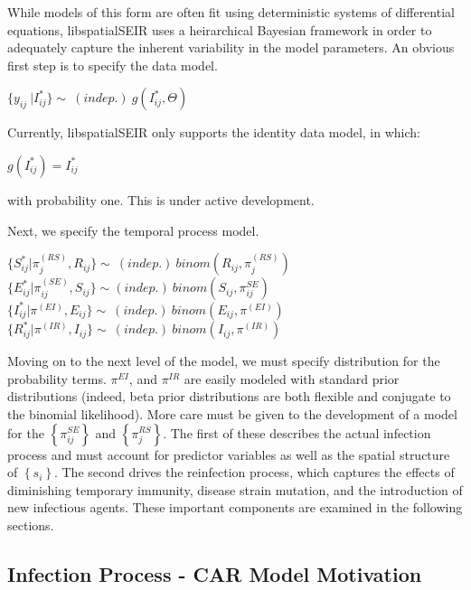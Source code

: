 \documentclass[12pt]{article}
\newcommand \noi {\noindent}
\newcommand \mbreak {\\ \vspace{0.1in}}
\begin{document}
    While models of this form are often fit using deterministic systems of differential equations, libspatialSEIR uses
    a heirarchical Bayesian framework in order to adequately capture the inherent variability in the model parameters.
    An obvious first step is to specify the data model. 

    \vspace{0.15in}

    \begin{center}
        $ \{y_{ij}\ | I^*_{ij}\} \sim\ (indep.)\ g(I^*_{ij}, \Theta)  $
    \end{center}

    Currently, libspatialSEIR only supports the identity data model, in which: 
    \begin{center}
        $g(I^*_{ij}) = I^*_{ij}$  
    \end{center}
    with probability one. This is under active development. \\

    \vspace{0.15in}

    Next, we specify the temporal process model. 
    \vspace{0.15in}
        \noi

        $\{S_{ij}^* | \pi_j^{(RS)}, R_{ij}\} \sim\ (indep.)\  binom(R_{ij}, \pi_j^{(RS)})$\mbreak
        $\{E_{ij}^* | \pi^{(SE)}_{ij}, S_{ij} \} \sim (indep.)\ binom(S_{ij}, \pi^{SE}_{ij})$ \mbreak
        $\{I_{ij}^* | \pi^{(EI)}, E_{ij} \} \sim\ (indep.)\ binom(E_{ij}, \pi^{(EI)})$\mbreak
        $\{R_{ij}^* | \pi^{(IR)}, I_{ij}\} \sim\ (indep.)\ binom(I_{ij}, \pi^{(IR)})$\mbreak


        Moving on to the next level of the model, we must specify distribution for the probability terms. $\pi^{EI}$, and $\pi^{IR}$ are easily modeled with standard prior distributions (indeed, beta prior distributions are both flexible and conjugate to the binomial likelihood).  
More care must be given to the development of a model for the $\left\{\pi^{SE}_{ij} \right\}$ and $\left\{\pi^{RS}_j \right\}$. The first of
these describes the actual infection process and must account for predictor variables as well as the 
spatial structure of $\left\{ s_i \right\}$. The second drives the reinfection process, which captures the effects of diminishing temporary immunity, 
disease strain mutation, and the introduction of new infectious agents. These important components are examined in the following sections. 


\subsection{Infection Process - CAR Model Motivation}
\end{document}
